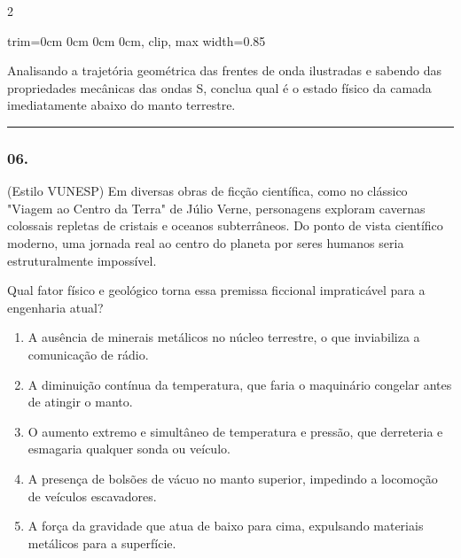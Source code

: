 \documentclass[twoside, 10pt, a4paper]{article}
\newlength{\espacoPreQuestao}
\newlength{\espacoQuestao}
\newlength{\espacoAlt}
\newcommand{\larguraTikz}{0.85\linewidth} %
\begin{document}
\begin{multicols*}{2}
\begin{center}
\begin{adjustbox}{trim=0cm 0cm 0cm 0cm, clip, max width=\larguraTikz}
\end{adjustbox}
\end{center}

Analisando a trajetória geométrica das frentes de onda ilustradas e sabendo das propriedades mecânicas das ondas S, conclua qual é o estado físico da camada imediatamente abaixo do manto terrestre.
\par\vspace{\espacoQuestao}

\noindent\textcolor{CorLinha}{\rule{\linewidth}{0.5pt}} 
\par\vspace{\espacoPreQuestao}
\subsubsection*{06.} (Estilo VUNESP) Em diversas obras de ficção científica, como no clássico "Viagem ao Centro da Terra" de Júlio Verne, personagens exploram cavernas colossais repletas de cristais e oceanos subterrâneos. Do ponto de vista científico moderno, uma jornada real ao centro do planeta por seres humanos seria estruturalmente impossível. 

Qual fator físico e geológico torna essa premissa ficcional impraticável para a engenharia atual?

\begin{enumerate}[label=\alph*), itemsep=\espacoAlt]
\item A ausência de minerais metálicos no núcleo terrestre, o que inviabiliza a comunicação de rádio.
\item A diminuição contínua da temperatura, que faria o maquinário congelar antes de atingir o manto.
\item O aumento extremo e simultâneo de temperatura e pressão, que derreteria e esmagaria qualquer sonda ou veículo.
\item A presença de bolsões de vácuo no manto superior, impedindo a locomoção de veículos escavadores.
\item A força da gravidade que atua de baixo para cima, expulsando materiais metálicos para a superfície.
\end{enumerate}
\par\vspace{\espacoQuestao}


\end{multicols*}
\end{document}
